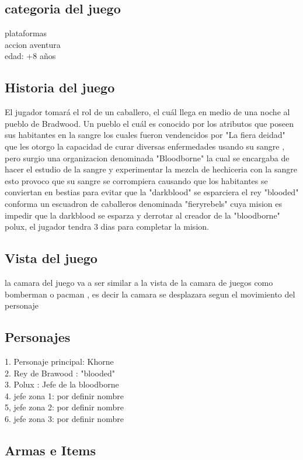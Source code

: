\documentclass{article}
\begin{document}
\subsection{categoria del juego}
plataformas \\
accion aventura\\ 
edad: +8 años\\

\subsection{Historia del juego}
El jugador tomará el rol de un caballero, el cuál llega en medio de una noche al pueblo de Bradwood. Un pueblo el cuál es conocido por los atributos que poseen sus habitantes en la sangre los cuales fueron vendencidos por "La fiera deidad" que les otorgo la capacidad de curar diversas enfermedades usando su sangre , pero surgio una organizacion denominada "Bloodborne" la cual se encargaba de hacer el estudio de la sangre y experimentar la mezcla de hechiceria con la sangre esto provoco que su sangre se corrompiera causando que los habitantes se conviertan en bestias para evitar que la "darkblood" se esparciera el rey "blooded" conforma un escuadron de caballeros denominada "fieryrebels" cuya mision es impedir que la darkblood se esparza
y derrotar al creador de la "bloodborne" polux, el jugador tendra 3 dias para completar la mision.

\subsection{Vista del juego}
la camara del juego va a ser similar a la vista de la camara de juegos como bomberman o pacman , es decir la camara se desplazara segun el movimiento del personaje

\subsection{Personajes}

1. Personaje principal: Khorne\\
2. Rey de Brawood : "blooded"\\
3. Polux : Jefe de la bloodborne\\
4. jefe zona 1: por definir nombre\\
5, jefe zona 2: por definir nombre\\
6. jefe zona 3: por definir nombre\\

\subsection{Armas e Items}
\end{document}
